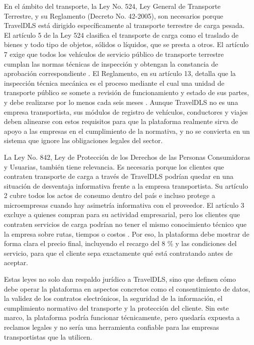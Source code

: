 En el ámbito del transporte, la Ley No. 524, Ley General de Transporte Terrestre, y su Reglamento (Decreto No. 42-2005), son necesarios porque TravelDLS está dirigido específicamente al transporte terrestre de carga pesada. El artículo 5 de la Ley 524 clasifica el transporte de carga como el traslado de bienes y todo tipo de objetos, sólidos o líquidos, que se presta a otros. El artículo 7 exige que todos los vehículos de servicio público de transporte terrestre cumplan las normas técnicas de inspección y obtengan la constancia de aprobación correspondiente \parencite[Arts. 5 y 7]{ley524_2005}. El Reglamento, en su artículo 13, detalla que la inspección técnica mecánica es el proceso mediante el cual una unidad de transporte público se somete a revisión de funcionamiento y estado de sus partes, y debe realizarse por lo menos cada seis meses \parencite[Art.13]{decreto42_2005}. Aunque TravelDLS no es una empresa transportista, sus módulos de registro de vehículos, conductores y viajes deben alinearse con estos requisitos para que la plataforma realmente sirva de apoyo a las empresas en el cumplimiento de la normativa, y no se convierta en un sistema que ignore las obligaciones legales del sector.

La Ley No. 842, Ley de Protección de los Derechos de las Personas Consumidoras y Usuarias, también tiene relevancia. Es necesaria porque los clientes que contraten transporte de carga a través de TravelDLS podrían quedar en una situación de desventaja informativa frente a la empresa transportista. Su artículo 2 cubre todos los actos de consumo dentro del país e incluso protege a microempresas cuando hay asimetría informativa con el proveedor. El artículo 3 excluye a quienes compran para su actividad empresarial, pero los clientes que contraten servicios de carga podrían no tener el mismo conocimiento técnico que la empresa sobre rutas, tiempos o costos \parencite[Arts. 2--3]{ley842_2013}. Por eso, la plataforma debe mostrar de forma clara el precio final, incluyendo el recargo del 8 \% y las condiciones del servicio, para que el cliente sepa exactamente qué está contratando antes de aceptar.

Estas leyes no solo dan respaldo jurídico a TravelDLS, sino que definen cómo debe operar la plataforma en aspectos concretos como el consentimiento de datos, la validez de los contratos electrónicos, la seguridad de la información, el cumplimiento normativo del transporte y la protección del cliente. Sin este marco, la plataforma podría funcionar técnicamente, pero quedaría expuesta a reclamos legales y no sería una herramienta confiable para las empresas transportistas que la utilicen.

